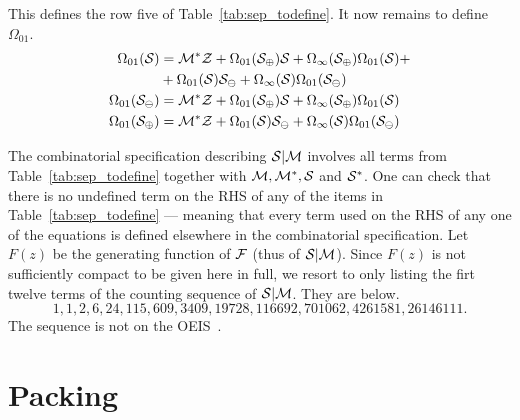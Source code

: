 \documentclass[12pt, a4paper, twoside]{report}
\begin{document}
This defines the row five of Table~\ref{tab:sep_todefine}. It now remains to define $\Omega_{01}$. 
\begin{align}
  \begin{aligned}
    \Omega_{01}(\S) %
    &= \Mstar\Z + \Omega_{01}(\S_\oplus)\S + \Omega_\infty(\S_\oplus)\Omega_{01}(\S) +\\
    &+\Omega_{01}(\S)\S_\ominus + \Omega_\infty(\S)\Omega_{01}(\S_\ominus)\\
    \Omega_{01}(\S_\ominus) %
    &= \Mstar\Z + \Omega_{01}(\S_\oplus)\S + \Omega_\infty(\S_\oplus)\Omega_{01}(\S)\\
    \Omega_{01}(\S_\oplus) %
    &= \Mstar\Z + \Omega_{01}(\S)\S_\ominus + \Omega_\infty(\S)\Omega_{01}(\S_\ominus)
  \end{aligned}
\end{align}

The combinatorial specification describing $\mathcal{S}|\mathcal{M}$ involves all terms from Table~\ref{tab:sep_todefine} together with $\mathcal{M}, \mathcal{M}^*, \mathcal{S}$ and $\mathcal{S}^*$. One can check that there is no undefined term on the RHS of any of the items in Table~\ref{tab:sep_todefine} --- meaning that every term used on the RHS of any one of the equations is defined elsewhere in the combinatorial specification. Let $F(z)$ be the generating function of $\mathcal{F}$ (thus of $\mathcal{S}|\mathcal{M}$). Since $F(z)$ is not sufficiently compact to be given here in full, we resort to only listing the firt twelve terms of the counting sequence of $\mathcal{S}|\mathcal{M}$. They are below.
$$1,1,2,6,24,115,609,3409, 19728, 116692, 701062, 4261581, 26146111.$$
The sequence is not on the OEIS~\cite{oeis}.

\part{Packing}
\label{part:packing}

%

%

{}

 
\end{document}
